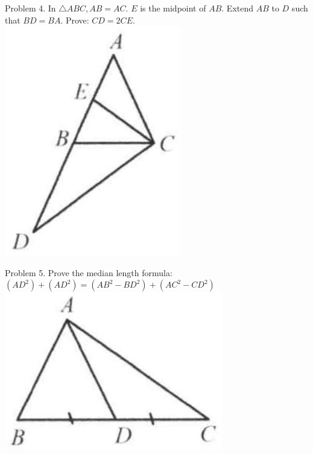 \documentclass[10pt]{article}
\begin{document}
Problem 4. In \(\triangle A B C, A B=A C\). \(E\) is the midpoint of \(A B\). Extend \(A B\) to \(D\) such that \(B D=B A\). Prove: \(C D=2 C E\).\\
\includegraphics[max width=\textwidth, center]{2025_04_17_97bc1f7e44d93c271a88g-027(1)}


Problem 5. Prove the median length formula:\\
\(\left(A D^{2}\right)+\left(A D^{2}\right)=\left(A B^{2}-B D^{2}\right)+\left(A C^{2}-C D^{2}\right)\)\\
\includegraphics[max width=\textwidth, center]{2025_04_17_97bc1f7e44d93c271a88g-028}
\end{document}
